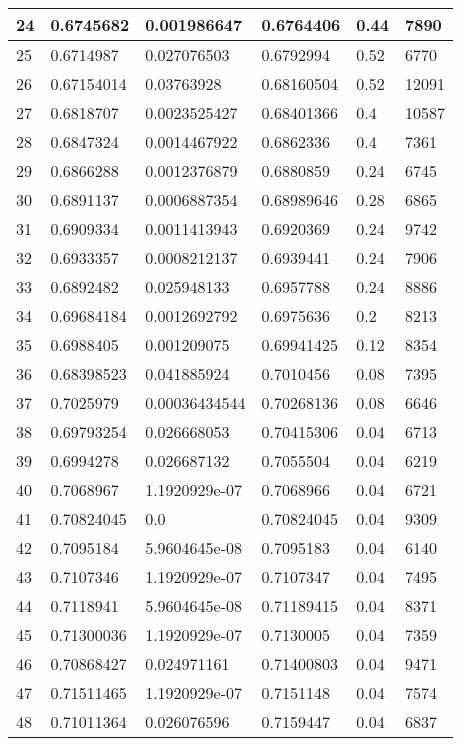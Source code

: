 \begin{longtable}{|l|l|l|l|l|l|}
24 & 0.6745682 & 0.001986647 & 0.6764406 & 0.44 & 7890 \\ \hline 
25 & 0.6714987 & 0.027076503 & 0.6792994 & 0.52 & 6770 \\ \hline 
26 & 0.67154014 & 0.03763928 & 0.68160504 & 0.52 & 12091 \\ \hline 
27 & 0.6818707 & 0.0023525427 & 0.68401366 & 0.4 & 10587 \\ \hline 
28 & 0.6847324 & 0.0014467922 & 0.6862336 & 0.4 & 7361 \\ \hline 
29 & 0.6866288 & 0.0012376879 & 0.6880859 & 0.24 & 6745 \\ \hline 
30 & 0.6891137 & 0.0006887354 & 0.68989646 & 0.28 & 6865 \\ \hline 
31 & 0.6909334 & 0.0011413943 & 0.6920369 & 0.24 & 9742 \\ \hline 
32 & 0.6933357 & 0.0008212137 & 0.6939441 & 0.24 & 7906 \\ \hline 
33 & 0.6892482 & 0.025948133 & 0.6957788 & 0.24 & 8886 \\ \hline 
34 & 0.69684184 & 0.0012692792 & 0.6975636 & 0.2 & 8213 \\ \hline 
35 & 0.6988405 & 0.001209075 & 0.69941425 & 0.12 & 8354 \\ \hline 
36 & 0.68398523 & 0.041885924 & 0.7010456 & 0.08 & 7395 \\ \hline 
37 & 0.7025979 & 0.00036434544 & 0.70268136 & 0.08 & 6646 \\ \hline 
38 & 0.69793254 & 0.026668053 & 0.70415306 & 0.04 & 6713 \\ \hline 
39 & 0.6994278 & 0.026687132 & 0.7055504 & 0.04 & 6219 \\ \hline 
40 & 0.7068967 & 1.1920929e-07 & 0.7068966 & 0.04 & 6721 \\ \hline 
41 & 0.70824045 & 0.0 & 0.70824045 & 0.04 & 9309 \\ \hline 
42 & 0.7095184 & 5.9604645e-08 & 0.7095183 & 0.04 & 6140 \\ \hline 
43 & 0.7107346 & 1.1920929e-07 & 0.7107347 & 0.04 & 7495 \\ \hline 
44 & 0.7118941 & 5.9604645e-08 & 0.71189415 & 0.04 & 8371 \\ \hline 
45 & 0.71300036 & 1.1920929e-07 & 0.7130005 & 0.04 & 7359 \\ \hline 
46 & 0.70868427 & 0.024971161 & 0.71400803 & 0.04 & 9471 \\ \hline 
47 & 0.71511465 & 1.1920929e-07 & 0.7151148 & 0.04 & 7574 \\ \hline 
48 & 0.71011364 & 0.026076596 & 0.7159447 & 0.04 & 6837 \\ \hline 

\end{longtable}
